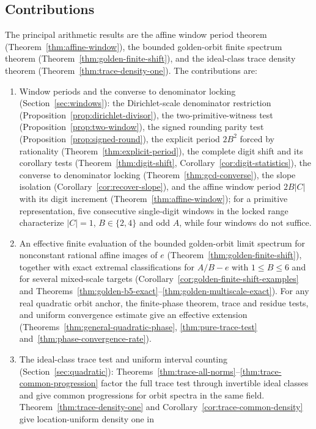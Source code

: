 \documentclass[11pt]{amsart}
\theoremstyle{definition}
\theoremstyle{remark}
\numberwithin{equation}{section}
\begin{document}
\subsection{Contributions} The principal arithmetic results are the affine window period theorem (Theorem~\ref{thm:affine-window}), the bounded golden-orbit finite spectrum theorem (Theorem~\ref{thm:golden-finite-shift}), and the ideal-class trace density theorem (Theorem~\ref{thm:trace-density-one}). The contributions are:
\begin{enumerate}
\item Window periods and the converse to denominator locking (Section~\ref{sec:windows}): the Dirichlet-scale denominator restriction (Proposition~\ref{prop:dirichlet-divisor}), the two-primitive-witness test (Proposition~\ref{prop:two-window}), the signed rounding parity test (Proposition~\ref{prop:signed-round}), the explicit period $2B^2$ forced by rationality (Theorem~\ref{thm:explicit-period}), the complete digit shift and its corollary tests (Theorem~\ref{thm:digit-shift}, Corollary~\ref{cor:digit-statistics}), the converse to denominator locking (Theorem~\ref{thm:gcd-converse}), the slope isolation (Corollary~\ref{cor:recover-slope}), and the affine window period $2B|C|$ with its digit increment (Theorem~\ref{thm:affine-window}); for a primitive representation, five consecutive single-digit windows in the locked range characterize $|C|=1$, $B\in\{2,4\}$ and odd $A$, while four windows do not suffice.
\item An effective finite evaluation of the bounded golden-orbit limit
spectrum for nonconstant rational affine images of $e$
(Theorem~\ref{thm:golden-finite-shift}), together with exact extremal
classifications for $A/B-e$ with $1\le B\le6$ and for several mixed-scale
targets (Corollary~\ref{cor:golden-finite-shift-examples} and
Theorems~\ref{thm:golden-b5-exact}--\ref{thm:golden-multiscale-exact}).
For any real quadratic orbit anchor, the finite-phase theorem, trace and
residue tests, and uniform convergence estimate give an effective extension
(Theorems~\ref{thm:general-quadratic-phase}, \ref{thm:pure-trace-test}
and~\ref{thm:phase-convergence-rate}).
\item The ideal-class trace test and uniform interval counting
(Section~\ref{sec:quadratic}):
Theorems~\ref{thm:trace-all-norms}--\ref{thm:trace-common-progression}
factor the full trace test through invertible ideal classes and
give common progressions for orbit spectra in the same field.
Theorem~\ref{thm:trace-density-one} and
Corollary~\ref{cor:trace-common-density} give location-uniform density one in

\end{enumerate}
\end{document}
